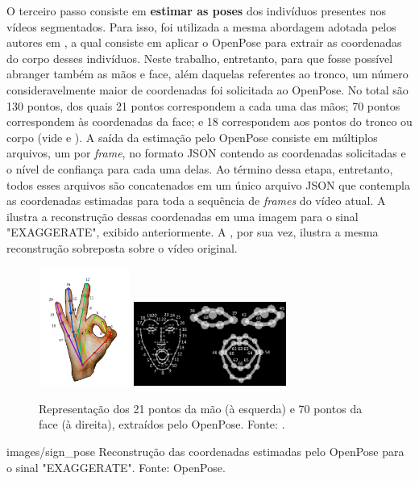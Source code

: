 O terceiro passo consiste em \textbf{estimar as poses} dos indivíduos presentes nos vídeos segmentados. Para isso, foi utilizada a mesma abordagem adotada pelos autores em \cite{st-gcn-2018}, a qual consiste em aplicar o OpenPose para extrair as coordenadas do corpo desses indivíduos. Neste trabalho, entretanto, para que fosse possível abranger também as mãos e face, além daquelas referentes ao tronco, um número consideravelmente maior de coordenadas foi solicitada ao OpenPose. No total são 130 pontos, dos quais 21 pontos correspondem a cada uma das mãos; 70 pontos correspondem às coordenadas da face; e 18 correspondem aos pontos do tronco ou corpo (vide  e ). A saída da estimação pelo OpenPose consiste em múltiplos arquivos, um por \textit{frame}, no formato JSON contendo as coordenadas solicitadas e o nível de confiança para cada uma delas. Ao término dessa etapa, entretanto, todos esses arquivos são concatenados em um único arquivo JSON que contempla as coordenadas estimadas para toda a sequência de \textit{frames} do vídeo atual. A  ilustra a reconstrução dessas coordenadas em uma imagem para o sinal "EXAGGERATE", exibido anteriormente. A , por sua vez, ilustra a mesma reconstrução sobreposta sobre o vídeo original.

\begin{figure}[ht]
    \centering
    \includegraphics[width=3cm]{images/keypoints_hand}
    \includegraphics[width=5cm]{images/keypoints_face}
    \caption{Representação dos 21 pontos da mão (à esquerda) e 70 pontos da face (à direita), extraídos pelo OpenPose. Fonte: \cite{openpose-output-2018}.}
    \label{fig:keypoints-face-hand}
\end{figure}

    {images/sign_pose}
    {Reconstrução das coordenadas estimadas pelo OpenPose para o sinal "EXAGGERATE". Fonte: OpenPose.}

